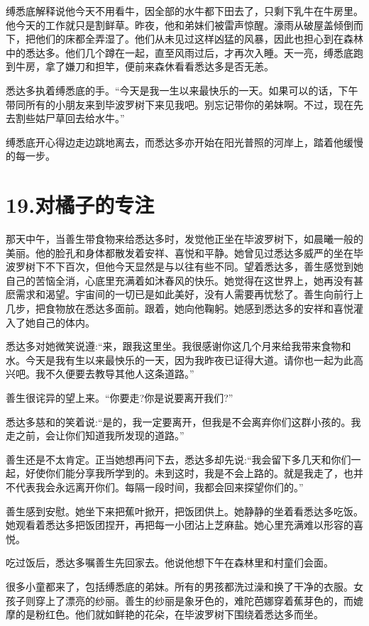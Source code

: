 \documentclass[12pt,twoside,openany]{book}
\begin{document}
缚悉底解释说他今天不用看牛，因全部的水牛都下田去了，只剩下乳牛在牛房里。他今天的工作就只是割鲜草。昨夜，他和弟妹们被雷声惊醒。濠雨从破屋盖倾倒而下，把他们的床都全弄湿了。他们从未见过这样凶猛的风暴，因此也担心到在森林中的悉达多。他们几个蹲在一起，直至风雨过后，才再次入睡。天一亮，缚悉底跑到牛房，拿了嫌刀和担竿，便前来森休看看悉达多是否无恙。

悉达多执着缚悉底的手。“今天是我一生以来最快乐的一天。如果可以的话，下午带同所有的小朋友来到毕波罗树下来见我吧。别忘记带你的弟妹啊。不过，现在先去割些姑尸草回去给水牛。”

缚悉底开心得边走边跳地离去，而悉达多亦开始在阳光普照的河岸上，踏着他缓慢的每一步。


\chapter{19.对橘子的专注}\label{ch19}

那天中午，当善生带食物来给悉达多时，发觉他正坐在毕波罗树下，如晨曦一般的美丽。他的脸孔和身体都散发着安祥、喜悦和平静。她曾见过悉达多威严的坐在毕波罗树下不下百次，但他今天显然是与以往有些不同。望着悉达多，善生感觉到她自己的苦恼全消，心底里充满着如沐春风的快乐。她觉得在这世界上，她再没有甚麽需求和渴望。宇宙间的一切已是如此美好，没有人需要再忧愁了。善生向前行上几步，把食物放在悉达多面前。跟着，她向他鞠躬。她感到悉达多的安祥和喜悦灌入了她自己的体内。

悉达多对她微笑说遵:“来，跟我这里坐。我很感谢你这几个月来给我带来食物和水。今天是我有生以来最怏乐的一天，因为我昨夜已证得大道。请你也一起为此高兴吧。我不久便要去教导其他人这条道路。”

善生很诧异的望上来。“你要走?你是说要离开我们?”

悉达多慈和的笑着说:“是的，我一定要离开，但我是不会离弃你们这群小孩的。我走之前，会让你们知道我所发现的道路。”

善生还是不太肯定。正当她想再问下去，悉达多却先说:“我会留下多几天和你们一起，好使你们能分享我所学到的。未到这时，我是不会上路的。就是我走了，也并不代表我会永远离开你们。每隔一段时间，我都会回来探望你们的。”

善生感到安慰。她坐下来把蕉叶掀开，把饭团供上。她静静的坐着看悉达多吃饭。她观看着悉达多把饭团捏开，再把每一小团沾上芝麻盐。她心里充满难以形容的喜悦。

吃过饭后，悉达多嘱善生先回家去。他说他想下午在森林里和村童们会面。

很多小童都来了，包括缚悉底的弟妹。所有的男孩都洗过澡和换了干净的衣服。女孩子则穿上了漂亮的纱丽。善生的纱丽是象牙色的，难陀芭娜穿着蕉芽色的，而媲摩的是粉红色。他们就如鲜艳的花朵，在毕波罗树下围绕着悉达多而坐。
\end{document}
